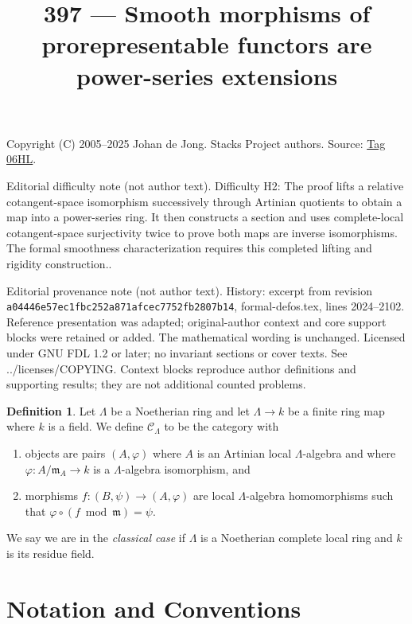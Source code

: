 \documentclass{amsart}
\theoremstyle{plain}
\theoremstyle{definition}
\newtheorem{definition}[subsection]{Definition}
\theoremstyle{remark}
\numberwithin{equation}{subsection}
\begin{document}
\title[Stacks Project, Tag 06HL]{397 --- Smooth morphisms of prorepresentable functors are power-series extensions}
\maketitle
\noindent Copyright (C) 2005--2025 Johan de Jong. Stacks Project authors. Source: \href{https://stacks.math.columbia.edu/tag/06HL}{Tag 06HL}.

\noindent Editorial difficulty note (not author text). Difficulty H2: The proof lifts a relative cotangent-space isomorphism successively through Artinian quotients to obtain a map into a power-series ring. It then constructs a section and uses complete-local cotangent-space surjectivity twice to prove both maps are inverse isomorphisms. The formal smoothness characterization requires this completed lifting and rigidity construction..

\noindent Editorial provenance note (not author text). History: excerpt from revision \texttt{a0444\allowbreak 6e57e\allowbreak c1fbc\allowbreak 252a8\allowbreak 71afc\allowbreak ec775\allowbreak 2fb28\allowbreak 07b14}, formal-defos.tex, lines 2024--2102. Reference presentation was adapted; original-author context and core support blocks were retained or added. The mathematical wording is unchanged. Licensed under GNU FDL 1.2 or later; no invariant sections or cover texts. See ../licenses/COPYING. Context blocks reproduce author definitions and supporting results; they are not additional counted problems.

\begin{definition}
\label{definition-CLambda}
Let $\Lambda$ be a Noetherian ring and let $\Lambda \to k$ be a finite
ring map where $k$ is a field. We define {\it $\mathcal{C}_\Lambda$} to be
the category with
\begin{enumerate}
\item objects are pairs $(A, \varphi)$ where $A$ is an Artinian local
$\Lambda$-algebra and where $\varphi : A/\mathfrak m_A \to k$ is a
$\Lambda$-algebra isomorphism, and
\item morphisms $f : (B, \psi) \to (A, \varphi)$ are local $\Lambda$-algebra
homomorphisms such that $\varphi \circ (f \bmod \mathfrak m) = \psi$.
\end{enumerate}
We say we are in the {\it classical case} if $\Lambda$ is a Noetherian
complete local ring and $k$ is its residue field.
\end{definition}

\section{Notation and Conventions}
\label{section-notations-conventions}
\end{document}

